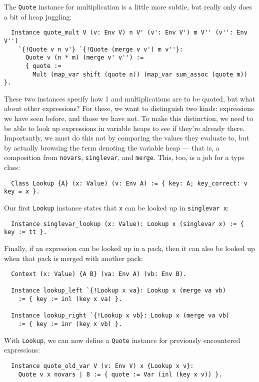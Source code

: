 \documentclass[a4paper,10pt,runningheads]{llncs}
\begin{document}
The \lstinline|Quote| instance for multiplication is a little more subtle, but really only does a bit of heap juggling:
\begin{lstlisting}
  Instance quote_mult V (v: Env V) n V' (v': Env V') m V'' (v'': Env V'')
    `{!Quote v n v'} `{!Quote (merge v v') m v''}:
      Quote v (n * m) (merge v' v'') :=
      { quote :=
        Mult (map_var shift (quote n)) (map_var sum_assoc (quote m)) }.
\end{lstlisting}

These two instances specify how 1 and multiplications are to be quoted, but what about other expressions? For these, we want to distinguish two kinds: expressions we have seen before, and those we have not. To make this distinction, we need to be able to look up expressions in variable heaps to see if they're already there. Importantly, we must do this not by comparing the values they evaluate to, but by actually browsing the term denoting the variable heap --- that is, a composition from \lstinline|novars|, \lstinline|singlevar|, and \lstinline|merge|. This, too, is a job for a type class:
\begin{lstlisting}
  Class Lookup {A} (x: Value) (v: Env A) := { key: A; key_correct: v key = x }.
\end{lstlisting}
Our first \lstinline|Lookup| instance states that \lstinline|x| can be looked up in \lstinline|singlevar x|:
\begin{lstlisting}
  Instance singlevar_lookup (x: Value): Lookup x (singlevar x) := { key := tt }.
\end{lstlisting}
Finally, if an expression can be looked up in a pack, then it can also be looked up when that pack is merged with another pack:
\begin{lstlisting}
  Context (x: Value) {A B} (va: Env A) (vb: Env B).

  Instance lookup_left `{!Lookup x va}: Lookup x (merge va vb)
    := { key := inl (key x va) }.

  Instance lookup_right `{!Lookup x vb}: Lookup x (merge va vb)
    := { key := inr (key x vb) }.
\end{lstlisting}

With \lstinline|Lookup|, we can now define a \lstinline|Quote| instance for previously encountered expressions:
\begin{lstlisting}
  Instance quote_old_var V (v: Env V) x {Lookup x v}:
    Quote v x novars | 8 := { quote := Var (inl (key x v)) }.
\end{lstlisting}
\end{document}
